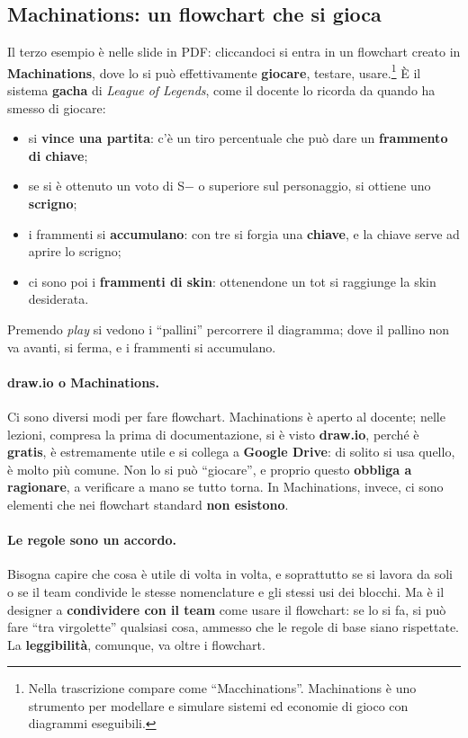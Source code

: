 \subsection{Machinations: un flowchart che si gioca}

Il terzo esempio è nelle slide in PDF: cliccandoci si entra in un flowchart
creato in \textbf{Machinations}, dove lo si può effettivamente
\textbf{giocare}, testare, usare.\footnote{Nella trascrizione compare come
``Macchinations''. Machinations è uno strumento per modellare e simulare
sistemi ed economie di gioco con diagrammi eseguibili.} È il sistema
\textbf{gacha} di \emph{League of Legends}, come il docente lo ricorda da
quando ha smesso di giocare:
\begin{itemize}
  \item si \textbf{vince una partita}: c'è un tiro percentuale che può dare un
        \textbf{frammento di chiave};
  \item se si è ottenuto un voto di S$-$ o superiore sul personaggio, si
        ottiene uno \textbf{scrigno};
  \item i frammenti si \textbf{accumulano}: con tre si forgia una
        \textbf{chiave}, e la chiave serve ad aprire lo scrigno;
  \item ci sono poi i \textbf{frammenti di skin}: ottenendone un tot si
        raggiunge la skin desiderata.
\end{itemize}
Premendo \emph{play} si vedono i ``pallini'' percorrere il diagramma; dove il
pallino non va avanti, si ferma, e i frammenti si accumulano.

\paragraph{draw.io o Machinations.} Ci sono diversi modi per fare flowchart.
Machinations è aperto al docente; nelle lezioni, compresa la prima di
documentazione, si è visto \textbf{draw.io}, perché è \textbf{gratis}, è
estremamente utile e si collega a \textbf{Google Drive}: di solito si usa
quello, è molto più comune. Non lo si può ``giocare'', e proprio questo
\textbf{obbliga a ragionare}, a verificare a mano se tutto torna. In
Machinations, invece, ci sono elementi che nei flowchart standard
\textbf{non esistono}.

\paragraph{Le regole sono un accordo.} Bisogna capire che cosa è utile di
volta in volta, e soprattutto se si lavora da soli o se il team condivide le
stesse nomenclature e gli stessi usi dei blocchi. Ma è il designer a
\textbf{condividere con il team} come usare il flowchart: se lo si fa, si può
fare ``tra virgolette'' qualsiasi cosa, ammesso che le regole di base siano
rispettate. La \textbf{leggibilità}, comunque, va oltre i flowchart.

